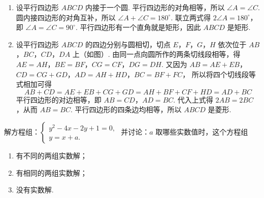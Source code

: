 \documentclass[UTF8,a4paper,oneside,11pt]{ctexbook}
\begin{document}
\begin{solution}
\begin{enumerate}
\item 设平行四边形 \(ABCD\) 内接于一个圆. 平行四边形的对角相等，所以 \(\angle A=\angle C\). 圆内接四边形的对角互补，所以 \(\angle A+\angle C=180^\circ\). 联立两式得 \(2\angle A=180^\circ\)，即 \(\angle A=\angle C=90^\circ\). 平行四边形有一个直角就是矩形，因此 \(ABCD\) 是矩形.


\item 设平行四边形 \(ABCD\) 的四边分别与圆相切，切点 \(E\)，\(F\)，\(G\)，\(H\) 依次位于 \(AB\)，\(BC\)，\(CD\)，\(DA\) 上（如图）. 由同一点向圆所作的两条切线段相等，得 \(AE=AH\)，\(BE=BF\)，\(CG=CF\)，\(DG=DH\). 又因为 \(AB=AE+EB\)，\(CD=CG+GD\)，\(AD=AH+HD\)，\(BC=BF+FC\)，
所以将四个切线段等式相加可得
\[
AB+CD=AE+EB+CG+GD=AH+BF+CF+HD=AD+BC
\]
平行四边形的对边相等，即 \(AB=CD\)，\(AD=BC\). 代入上式得 \(2AB=2BC\)，从而 \(AB=BC\). 平行四边形的四条边均相等，所以 \(ABCD\) 是菱形.

\end{enumerate}
\end{solution}

\begin{problem}
解方程组：\(
\begin{cases}
y^2-4x-2y+1=0,\\
y=x+a.
\end{cases}
\)
并讨论：\(a\) 取哪些实数值时，这个方程组

\begin{enumerate}
\item 有不同的两组实数解；
\item 有相同的两组实数解；
\item 没有实数解.
\end{enumerate}
\end{problem}
\end{document}
